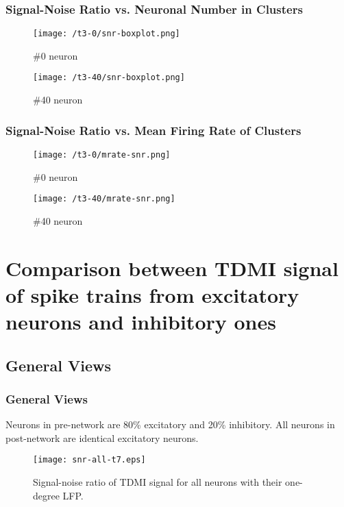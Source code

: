 \documentclass{beamer}
\begin{document}
	\begin{frame}
	\frametitle{Signal-Noise Ratio vs. Neuronal Number in Clusters}
	\begin{figure}[h]
		\centering
		\begin{minipage}[ht]{0.49\linewidth}
			\centering
			\texttt{[image: /t3-0/snr-boxplot.png]}
			\caption{\#0 neuron}
		\end{minipage}
		\begin{minipage}[ht]{0.49\linewidth}
			\centering
			\texttt{[image: /t3-40/snr-boxplot.png]}
			\caption{\#40 neuron}
		\end{minipage}
		\label{fig:snr_box}
	\end{figure}
	\end{frame}

	\begin{frame}
	\frametitle{Signal-Noise Ratio vs. Mean Firing Rate of Clusters}
	\begin{figure}[h]
		\centering
		\begin{minipage}[ht]{0.49\linewidth}
			\centering
			\texttt{[image: /t3-0/mrate-snr.png]}
			\caption{\#0 neuron}
		\end{minipage}
		\begin{minipage}[ht]{0.49\linewidth}
			\centering
			\texttt{[image: /t3-40/mrate-snr.png]}
			\caption{\#40 neuron}
		\end{minipage}
		\label{fig:mrate_snr}
	\end{figure}
	\end{frame}

	\section{Comparison between TDMI signal of spike trains from excitatory neurons and inhibitory ones}
	\subsection{General Views}
	\begin{frame}
	\frametitle{General Views}
		\footnotesize{Neurons in pre-network are 80\% excitatory and 20\% inhibitory. All neurons in post-network are identical excitatory neurons.} 
		\begin{figure}
			\centering
			\texttt{[image: snr-all-t7.eps]}
			\caption{\footnotesize{Signal-noise ratio of TDMI signal for all neurons with their one-degree LFP.}}
			\label{fig:snr_all_2}
		\end{figure}
	\end{frame}
\end{document}
